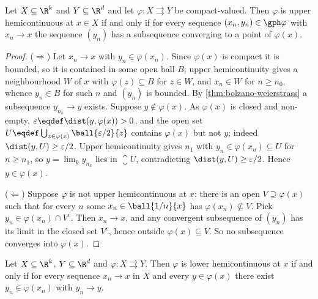 \begin{theorem}\label{thm:uhc-sequential}
	Let $X\subseteq\R^{k}$ and $Y\subseteq\R^{d}$ and let
	$\varphi\colon X\rightrightarrows Y$ be compact-valued. Then $\varphi$ is upper
	hemicontinuous at $x\in X$ if and only if for every sequence
	$(x_n,y_n)\in\gph\varphi$ with $x_n\to x$ the sequence $(y_n)$ has a subsequence
	converging to a point of $\varphi(x)$.
\end{theorem}

\begin{proof}
	($\Rightarrow$) Let $x_n\to x$ with $y_n\in\varphi(x_n)$. Since $\varphi(x)$ is
	compact it is bounded, so it is contained in some open ball $B$; upper
	hemicontinuity gives a neighbourhood $W$ of $x$ with $\varphi(z)\subseteq B$
	for $z\in W$, and $x_n\in W$ for $n\geq n_0$, whence $y_n\in B$ for such $n$ and
	$(y_n)$ is bounded. By \autoref{thm:bolzano-weierstrass} a subsequence
	$y_{n_k}\to y$ exists. Suppose $y\notin\varphi(x)$. As $\varphi(x)$ is closed
	and non-empty, $\varepsilon\eqdef\dist(y,\varphi(x))>0$, and the open set
	$U\eqdef\bigcup_{z\in\varphi(x)}\ball{\varepsilon/2}{z}$ contains $\varphi(x)$
	but not $y$; indeed $\dist(y,U)\geq\varepsilon/2$. Upper hemicontinuity gives
	$n_1$ with $y_n\in\varphi(x_n)\subseteq U$ for $n\geq n_1$, so
	$y=\lim_ky_{n_k}$ lies in $\closure{U}$, contradicting
	$\dist(y,U)\geq\varepsilon/2$. Hence $y\in\varphi(x)$.

	($\Leftarrow$) Suppose $\varphi$ is not upper hemicontinuous at $x$: there is an
	open $V\supseteq\varphi(x)$ such that for every $n$ some
	$x_n\in\ball{1/n}{x}$ has $\varphi(x_n)\not\subseteq V$. Pick
	$y_n\in\varphi(x_n)\cap V^{c}$. Then $x_n\to x$, and any convergent subsequence
	of $(y_n)$ has its limit in the closed set $V^{c}$, hence outside
	$\varphi(x)\subseteq V$. So no subsequence converges into $\varphi(x)$.
\end{proof}

\begin{theorem}\label{thm:lhc-sequential}
	Let $X\subseteq\R^{k}$, $Y\subseteq\R^{d}$ and
	$\varphi\colon X\rightrightarrows Y$. Then $\varphi$ is lower hemicontinuous at
	$x$ if and only if for every sequence $x_n\to x$ in $X$ and every
	$y\in\varphi(x)$ there exist $y_n\in\varphi(x_n)$ with $y_n\to y$.
\end{theorem}

